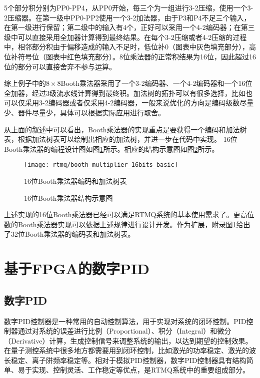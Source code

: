 5个部分积分别为PP0-PP4，从PP0开始，每三个为一组进行3-2压缩，使用一个3-2压缩器。在第一级中PP0-PP2使用一个3-2加法器，由于P3和P4不足三个输入，在第一级进行保留；第二级中的输入有4个，正好可以采用一个4-2编码器；在第三级中可以直接采用全加器计算得到最终结果。在每个3-2压缩或者4-2压缩的过程中，相邻部分积由于偏移造成的输入不足时，低位补0（图表中灰色填充部分），高位补符号位（图表中红色填充部分）。8位乘法器的正常积结果为16位，因此超过16位的部分可以直接舍弃不参与运算。

综上例子中的$8\times 8$Booth乘法器采用了一个3-2编码器、一个4-2编码器和一个16位全加器，经过3级流水线计算得到最终积。加法树的拓扑可以有很多选择，比如也可以仅采用3-2编码器或者仅采用4-2编码器，一般来说优化的方向是编码级数尽量少、器件尽量少，具体可以根据实际应用进行取舍。

从上面的叙述中可以看出，Booth乘法器的实现重点是要获得一个编码和加法树表，根据加法树表可以绘制出相应的加法树，并进一步在代码中实现。
16位Booth乘法器的编程设计图如图\ref{fig:booth_multiplier_16bits_basic}所示。相应的结构示意图如图\ref{fig:booth_multiplier_16bits_basic_s}所示。
\begin{figure}
    \centering
    \caption[16位Booth乘法器编码和加法树表]{16位Booth乘法器编码和加法树表\label{fig:booth_multiplier_16bits_basic}}
    \texttt{[image: rtmq/booth\_multiplier\_16bits\_basic]}
\end{figure}

\begin{figure}
    \centering
    \caption[16位Booth乘法器结构示意图]{16位Booth乘法器结构示意图\label{fig:booth_multiplier_16bits_basic_s}}
    
\end{figure}

上述实现的16位Booth乘法器已经可以满足RTMQ系统的基本使用需求了。更高位数的Booth乘法器实现可以依据上述规律进行设计开发。作为扩展，附录图\ref{fig:booth_multiplier_16bits_basic}给出了32位Booth乘法器的编码表和加法树表。









\newpage
\section[基于FPGA的数字PID]{基于FPGA的数字PID\label{section:digital_pid}}
\subsection[数字PID]{数字PID}
数字PID控制器是一种常用的自动控制算法，用于实现对系统的闭环控制。PID控制器通过对系统的误差进行比例（Proportional）、积分（Integral）和微分（Derivative）计算，生成控制信号来调整系统的输出，以达到期望的控制效果。在量子测控系统中很多地方都需要用到闭环控制，比如激光的功率稳定、激光的波长稳定、离子阱频率稳定等。相对于模拟PID控制器，数字PID控制器具有结构简单、易于实现、控制灵活、工作稳定等优点，是RTMQ系统中的重要组成部分。

